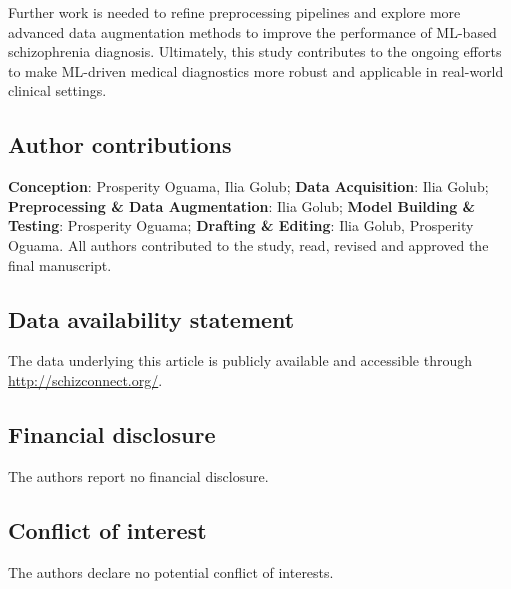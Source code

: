 Further work is needed to refine preprocessing pipelines and explore more advanced data augmentation methods to improve the performance of ML-based schizophrenia diagnosis. Ultimately, this study contributes to the ongoing efforts to make ML-driven medical diagnostics more robust and applicable in real-world clinical settings.



\subsection*{Author contributions}

\textbf{Conception}: Prosperity Oguama, Ilia Golub; \textbf{Data Acquisition}: Ilia Golub; \textbf{Preprocessing \& Data Augmentation}: Ilia Golub; \textbf{Model Building \& Testing}: Prosperity Oguama; \textbf{Drafting \& Editing}: Ilia Golub, Prosperity Oguama. All authors contributed to the study, read, revised and approved the final manuscript.

\subsection*{Data availability statement}
The data underlying this article is publicly available and accessible through \hyperlink{Schizconnect}{http://schizconnect.org/}.

\subsection*{Financial disclosure}

The authors report no financial disclosure.

\subsection*{Conflict of interest}

The authors declare no potential conflict of interests.

\renewcommand{\baselinestretch}{1.5}
\cleardoublepage    %



